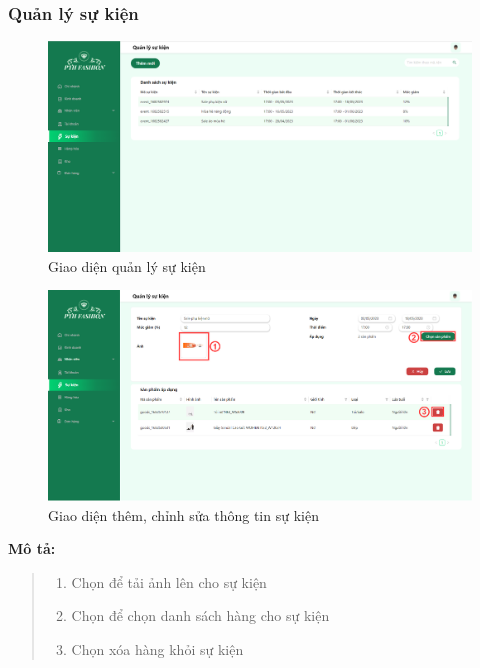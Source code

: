 \newpage


\subsubsection{Quản lý sự kiện}
\begin{figure}[!htp]
    \centering
    \includegraphics[width=12cm]{img/UI/admin_implement/event.png}
    \newline
    \caption{Giao diện quản lý sự kiện}
\end{figure}


\begin{figure}[!htp]
    \centering
    \includegraphics[width=12cm]{img/UI/admin_implement/eventEdit.png}
    \newline
    \caption{Giao diện thêm, chỉnh sửa thông tin sự kiện}
\end{figure}
\textbf{Mô tả:}
\begin{quote}
    \begin{enumerate}
        \item Chọn để tải ảnh lên cho sự kiện
        \item Chọn để chọn danh sách hàng cho sự kiện
        \item Chọn xóa hàng khỏi sự kiện
    \end{enumerate}
\end{quote}

